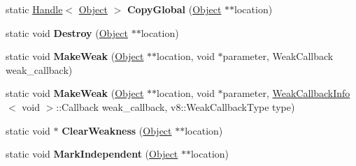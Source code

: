 \begin{DoxyCompactItemize}
\item 
static \hyperlink{classv8_1_1internal_1_1_handle}{Handle}$<$ \hyperlink{classv8_1_1internal_1_1_object}{Object} $>$ {\bfseries Copy\+Global} (\hyperlink{classv8_1_1internal_1_1_object}{Object} $\ast$$\ast$location)\hypertarget{classv8_1_1internal_1_1_global_handles_ac597513b32ed032832df59433dafbf16}{}\label{classv8_1_1internal_1_1_global_handles_ac597513b32ed032832df59433dafbf16}

\item 
static void {\bfseries Destroy} (\hyperlink{classv8_1_1internal_1_1_object}{Object} $\ast$$\ast$location)\hypertarget{classv8_1_1internal_1_1_global_handles_adfc22e35952c6df07ae8c8e1d1ac499a}{}\label{classv8_1_1internal_1_1_global_handles_adfc22e35952c6df07ae8c8e1d1ac499a}

\item 
static void {\bfseries Make\+Weak} (\hyperlink{classv8_1_1internal_1_1_object}{Object} $\ast$$\ast$location, void $\ast$parameter, Weak\+Callback weak\+\_\+callback)\hypertarget{classv8_1_1internal_1_1_global_handles_a21d3bdc56a5b213b53e9d12ecf2ca712}{}\label{classv8_1_1internal_1_1_global_handles_a21d3bdc56a5b213b53e9d12ecf2ca712}

\item 
static void {\bfseries Make\+Weak} (\hyperlink{classv8_1_1internal_1_1_object}{Object} $\ast$$\ast$location, void $\ast$parameter, \hyperlink{classv8_1_1_weak_callback_info}{Weak\+Callback\+Info}$<$ void $>$\+::Callback weak\+\_\+callback, v8\+::\+Weak\+Callback\+Type type)\hypertarget{classv8_1_1internal_1_1_global_handles_a46f9b3b282d7e0cdf849a709ec4f47d5}{}\label{classv8_1_1internal_1_1_global_handles_a46f9b3b282d7e0cdf849a709ec4f47d5}

\item 
static void $\ast$ {\bfseries Clear\+Weakness} (\hyperlink{classv8_1_1internal_1_1_object}{Object} $\ast$$\ast$location)\hypertarget{classv8_1_1internal_1_1_global_handles_a2e009c5a6d7d5fff5d176961107571a9}{}\label{classv8_1_1internal_1_1_global_handles_a2e009c5a6d7d5fff5d176961107571a9}

\item 
static void {\bfseries Mark\+Independent} (\hyperlink{classv8_1_1internal_1_1_object}{Object} $\ast$$\ast$location)\hypertarget{classv8_1_1internal_1_1_global_handles_a4096f08b9b8f947efcbb23310750f519}{}\label{classv8_1_1internal_1_1_global_handles_a4096f08b9b8f947efcbb23310750f519}


\end{DoxyCompactItemize}
